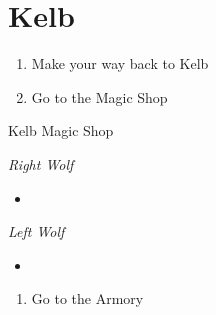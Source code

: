 \chapter{Kelb}

\vspace{\baselineskip}

\begin{paracol}{2}

\begin{enumerate}
    \item Make your way back to Kelb
    \item Go to the Magic Shop
\end{enumerate}

\begin{shop}{Kelb Magic Shop}
    \varwb
    \begin{buy}
        \item \textit{Right Wolf}
        \begin{itemize}
            \item {} \reset
        \end{itemize}
        \item \textit{Left Wolf}
        \item \begin{itemize}
            \item {} \breakSpell
        \end{itemize}
    \end{buy}
    \varwe
\end{shop}

\begin{enumerate}[resume]
    \item Go to the Armory
\end{enumerate}


\end{paracol}
